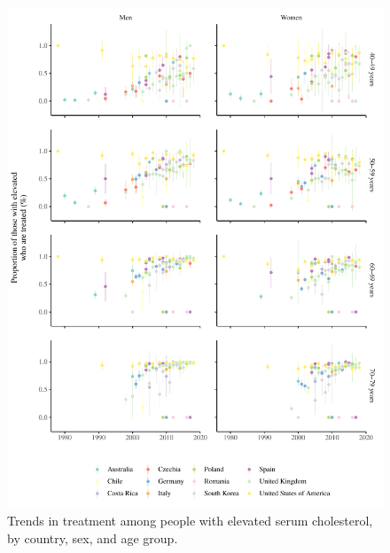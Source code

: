 \documentclass[12pt]{article}
\begin{document}
\begin{figure}[hp]
    \centering
    \includegraphics[width=\textwidth]{../3_figures/fig3_treated.pdf}
    \caption{Trends in treatment among people with elevated serum cholesterol, by country, sex, and age group.}
    \label{fig:treated}
\end{figure}

\clearpage
\setlength\bibsep{0pt}


\end{document}
